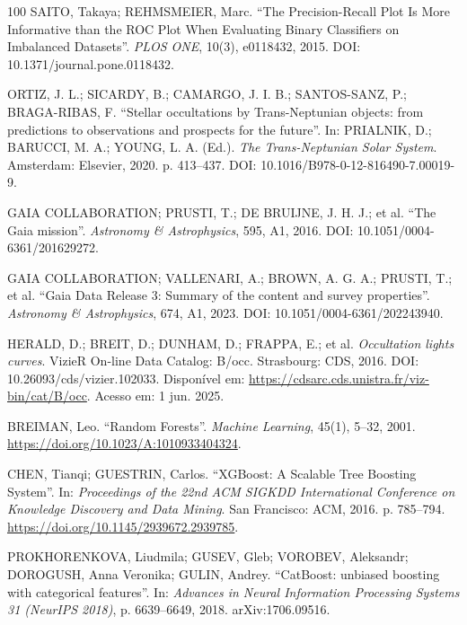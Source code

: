 \documentclass[msc]{on} %
\providecommand{\DIFaddtex}[1]{{\protect\color{red}#1}} %
\providecommand{\DIFaddbegin}{} %
\providecommand{\DIFaddend}{} %
\providecommand{\DIFadd}[1]{\texorpdfstring{\DIFaddtex{#1}}{#1}} %
\begin{document}
\begin{thebibliography}{100}
 SAITO, Takaya; REHMSMEIER, Marc. ``The Precision-Recall Plot Is More Informative than the ROC Plot When Evaluating Binary Classifiers on Imbalanced Datasets''. \emph{PLOS ONE}, 10(3), e0118432, 2015. DOI: 10.1371/journal.pone.0118432.

 ORTIZ, J. L.; SICARDY, B.; CAMARGO, J. I. B.; SANTOS-SANZ, P.; BRAGA-RIBAS, F. ``Stellar occultations by Trans-Neptunian objects: from predictions to observations and prospects for the future''. In: PRIALNIK, D.; BARUCCI, M. A.; YOUNG, L. A. (Ed.). \emph{The Trans-Neptunian Solar System}. Amsterdam: Elsevier, 2020. p. 413--437. DOI: 10.1016/B978-0-12-816490-7.00019-9.

 GAIA COLLABORATION; PRUSTI, T.; DE BRUIJNE, J. H. J.; et al. ``The Gaia mission''. \emph{Astronomy \& Astrophysics}, 595, A1, 2016. DOI: 10.1051/0004-6361/201629272.

 GAIA COLLABORATION; VALLENARI, A.; BROWN, A. G. A.; PRUSTI, T.; et al. ``Gaia Data Release 3: Summary of the content and survey properties''. \emph{Astronomy \& Astrophysics}, 674, A1, 2023. DOI: 10.1051/0004-6361/202243940.

 HERALD, D.; BREIT, D.; DUNHAM, D.; FRAPPA, E.; et al. \textit{Occultation lights curves}. VizieR On-line Data Catalog: B/occ. Strasbourg: CDS, 2016. DOI: 10.26093/cds/vizier.102033. Disponível em: \url{https://cdsarc.cds.unistra.fr/viz-bin/cat/B/occ}. \DIFaddbegin \DIFadd{Acesso em: 1 jun. 2025.
}\DIFaddend 

 BREIMAN, Leo. ``Random Forests''. \emph{Machine Learning}, 45(1), 5--32, 2001. \url{https://doi.org/10.1023/A:1010933404324}.

 CHEN, Tianqi; GUESTRIN, Carlos. ``XGBoost: A Scalable Tree Boosting System''. In: \emph{Proceedings of the 22nd ACM SIGKDD International Conference on Knowledge Discovery and Data Mining}. San Francisco: ACM, 2016. p. 785--794. \url{https://doi.org/10.1145/2939672.2939785}.

 PROKHORENKOVA, Liudmila; GUSEV, Gleb; VOROBEV, Aleksandr; DOROGUSH, Anna Veronika; GULIN, Andrey. ``CatBoost: unbiased boosting with categorical features''. In: \emph{Advances in Neural Information Processing Systems 31 (NeurIPS 2018)}, p. 6639--6649, 2018. arXiv:1706.09516.


\end{thebibliography}
\end{document}
